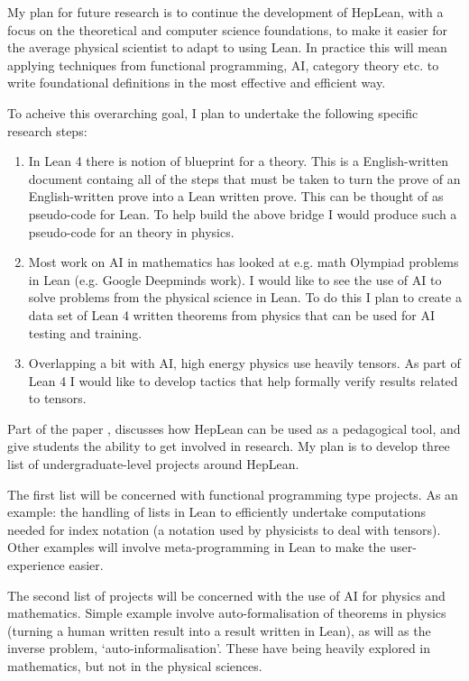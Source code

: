 \documentclass[12pt,letter]{article}
\newcounter{customtitle}
\begin{document}
My plan for future research is to continue the development of HepLean, with a focus on the theoretical and computer science foundations, to make it easier for the average physical scientist to adapt to using Lean. In practice this will mean applying techniques from functional programming, AI, category theory etc. to write foundational definitions in the most effective and efficient way. 

To acheive this overarching goal, I plan to undertake the following specific research steps:  
\begin{enumerate}
\item In Lean 4 there is notion of blueprint for a theory. This is 
a English-written document containg all of the steps that must be taken
to turn the prove of an English-written prove into a Lean written prove. 
This can be thought of as pseudo-code for Lean. To help build the above 
bridge I would produce such a pseudo-code for an theory in physics.
\item Most work on AI in mathematics has looked at e.g. math Olympiad problems
in Lean (e.g. Google Deepminds work). I would like to see the use 
of AI to solve problems from the physical science in Lean. To do this 
I plan to create a data set of Lean 4 written theorems from physics 
that can be used for AI testing and training.
\item Overlapping a bit with AI, high energy physics use heavily tensors. 
As part of Lean 4 I would like to develop tactics that help formally verify 
results related to tensors.
\end{enumerate}



Part of the paper , discusses how HepLean can be used 
as a pedagogical tool, and give students the ability to get involved in research.  My plan is to develop three list of undergraduate-level projects around HepLean. 

The first list will be concerned with functional programming type projects. As an example: the handling of lists in Lean to efficiently undertake computations needed for index notation (a notation used by physicists to deal with tensors). Other examples will involve meta-programming in Lean to make the user-experience easier.

The second list of projects  will be concerned with the use of AI for physics and mathematics. Simple example involve auto-formalisation of theorems in physics (turning a human written result into a result written in Lean), as will as the inverse problem, `auto-informalisation'. These have being heavily explored in mathematics, but not in the physical sciences. 
\end{document}
